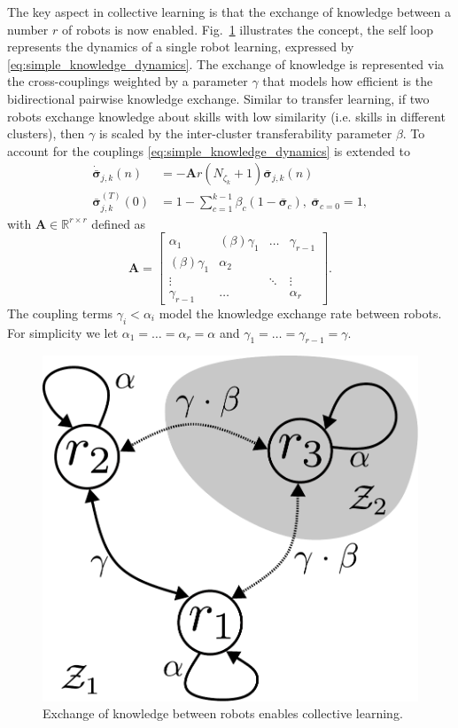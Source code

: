 The key aspect in collective learning is that the exchange of knowledge between a number $r$ of robots is now enabled. Fig.~\ref{fig:cl_example_figure} illustrates the concept, the self loop represents the dynamics of a single robot learning, expressed by \eqref{eq:simple_knowledge_dynamics}. The exchange of knowledge is represented via the cross-couplings weighted by a parameter $\gamma$ that models how efficient is the bidirectional pairwise knowledge exchange. Similar to transfer learning, if two robots exchange knowledge about skills with low similarity (i.e. skills in different clusters), then $\gamma$ is scaled by the inter-cluster transferability  parameter $\beta$. To account for the couplings \eqref{eq:simple_knowledge_dynamics} is extended to
\begin{subequations}\label{eq:collective_knowledge_dynamics}
	\begin{alignat}{2}
		\dot{\bar{\bm{\sigma}}}_{j,k}\left(n\right) &= -\bm{A} r \left(N_{\zeta_k} + 1\right) \bar{\bm{\sigma}}_{j,k}\left(n\right)\\
		\bar{\bm{\sigma}}^{(T)}_{j,k}(0) &= 1 - \sum\limits_{c = 1}^{k-1}\beta_{c} \left( 1 - \bar{\bm{\sigma}}_{c} \right),~\bar{\bm{\sigma}}_{c=0} = 1,
	\end{alignat}
\end{subequations}
with $\bm{A} \in \mathbb{R}^{r \times r}$ defined as
\begin{equation}
	\bm{A} = \begin{bmatrix} 
		\alpha_1 & (\beta)\gamma_1  & \dots   & \gamma_{r-1}\\
		(\beta)\gamma_1 & \alpha_2  &         &  \\
 		\vdots &         & \ddots  & \vdots\\
		\gamma_{r-1} & \dots   &         & \alpha_r 
	\end{bmatrix}.
\end{equation}
The coupling terms $\gamma_i < \alpha_i$ model the knowledge exchange rate between robots. For simplicity we let $\alpha_1=\dots=\alpha_r=\alpha$ and $\gamma_1=\dots=\gamma_{r-1}=\gamma$.
\begin{figure}[!t]
	\centering
	\includegraphics[width=0.7\columnwidth]{fig/cl_example_figure.pdf}
	\caption{Exchange of knowledge between robots enables collective learning.}
	\label{fig:cl_example_figure}
\end{figure}

